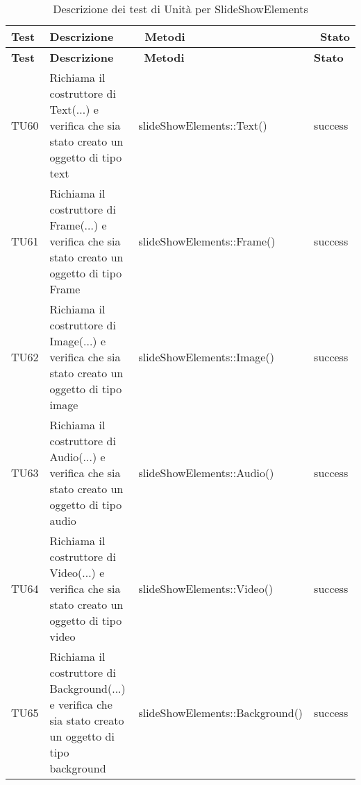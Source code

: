 		   \begin{longtable} [c]{| p{2cm} | p{6cm} |p{3cm} | p{2cm} |}
		 		 	 						\caption{Descrizione dei test di Unità per SlideShowElements \label{tab:verTestUnit}}\\
		 	  		 \hline
		 	  		 \textbf{Test} & \textbf{Descrizione} & \ \textbf{Metodi} & \ \textbf{Stato} \\
		 	  		 \hline
		 	  		 \endfirsthead
		 	  		 \hline
		 	  		 \textbf{Test} & \textbf{Descrizione} & \ \textbf{Metodi} & \textbf{Stato} \\
		 	  		 \hline
		 		 	 						\endhead
		 	  		 \hline
		 	  		 \endfoot
		 	  		 \hline
		 	  		 \endlastfoot
		  		 TU60 & Richiama il costruttore di Text(...) e verifica che sia stato creato un oggetto di tipo text  & slideShowElements::Text() & success \\
		  		 TU61 & Richiama il costruttore di Frame(...) e verifica che sia stato creato un oggetto di tipo Frame\ped{g} & slideShowElements::Frame() & success \\
		  		 TU62 & Richiama il costruttore di Image(...) e verifica che sia stato creato un oggetto di tipo image & slideShowElements::Image() & success \\
		  		 TU63 & Richiama il costruttore di Audio(...) e verifica che sia stato creato un oggetto di tipo audio  & slideShowElements::Audio() & success \\
		  		 TU64 & Richiama il costruttore di Video(...) e verifica che sia stato creato un oggetto di tipo video  & slideShowElements::Video() & success \\
		  		 TU65 & Richiama il costruttore di Background(...) e verifica che sia stato creato un oggetto di tipo background  & slideShowElements::Background() & success \\
		  		 
		  		 \end{longtable}
